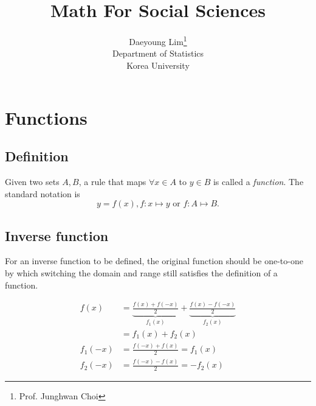 \documentclass[11pt]{article}
\begin{document}
\nocite{*}

\title{Math For Social Sciences}

\author{Daeyoung Lim\thanks{Prof. Junghwan Choi} \\
Department of Statistics \\
Korea University}

\maketitle

\section{Functions}
\subsection{Definition}
Given two sets $A, B$, a rule that maps $\forall x \in A$ to $y \in B$ is called a \emph{function}. The standard notation is
$$
  y = f\left(x\right), f:x\mapsto y\text{ or } f:A\mapsto B.
$$

\subsection{Inverse function}
For an inverse function to be defined, the original function should be one-to-one by which switching the domain and range still satisfies the definition of a function.

\begin{align*}
  f\left(x\right) &= \underbrace{\frac{f\left(x\right) +f\left(-x\right)}{2}}_{f_{1}\left(x\right)} +\underbrace{\frac{f\left(x\right)-f\left(-x\right)}{2}}_{f_{2}\left(x\right)}\\
  &= f_{1}\left(x\right) +f_{2}\left(x\right)\\
  f_{1}\left(-x\right) &= \frac{f\left(-x\right)+f\left(x\right)}{2} = f_{1}\left(x\right) \\
  f_{2}\left(-x\right) &= \frac{f\left(-x\right) -f\left(x\right)}{2} = -f_{2}\left(x\right)
\end{align*}
\end{document}
